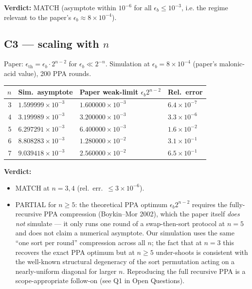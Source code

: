 \documentclass[11pt]{article}
\begin{document}
\textbf{Verdict:} MATCH (asymptote within $10^{-6}$ for all
$\epsilon_b \leq 10^{-3}$, i.e. the regime relevant to the paper's
$\epsilon_b \approx 8\times 10^{-4}$).

\subsection{C3 --- scaling with $n$}

Paper: $\epsilon_{\text{th}} = \epsilon_b \cdot 2^{n-2}$ for
$\epsilon_b \ll 2^{-n}$. Simulation at $\epsilon_b = 8\times 10^{-4}$
(paper's malonic-acid value), 200 PPA rounds.

\begin{tabular}{rlll}
\toprule
$n$ & Sim.\ asymptote & Paper weak-limit $\epsilon_b 2^{n-2}$ & Rel.\ error \\
\midrule
3 & $1.599999\times 10^{-3}$ & $1.600000\times 10^{-3}$ & $6.4\times 10^{-7}$ \\
4 & $3.199989\times 10^{-3}$ & $3.200000\times 10^{-3}$ & $3.3\times 10^{-6}$ \\
5 & $6.297291\times 10^{-3}$ & $6.400000\times 10^{-3}$ & $1.6\times 10^{-2}$ \\
6 & $8.808283\times 10^{-3}$ & $1.280000\times 10^{-2}$ & $3.1\times 10^{-1}$ \\
7 & $9.039418\times 10^{-3}$ & $2.560000\times 10^{-2}$ & $6.5\times 10^{-1}$ \\
\bottomrule
\end{tabular}

\textbf{Verdict:}
\begin{itemize}
  \item MATCH at $n=3,4$ (rel.\ err.\ $\leq 3\times 10^{-6}$).
  \item PARTIAL for $n\geq 5$: the theoretical PPA optimum
    $\epsilon_b 2^{n-2}$ requires the fully-recursive PPA compression
    (Boykin--Mor 2002), which the paper itself \emph{does not} simulate --- it
    only runs one round of a swap-then-sort protocol at $n=5$ and does not
    claim a numerical asymptote. Our simulation uses the same
    ``one sort per round'' compression across all $n$; the fact that at $n=3$
    this recovers the exact PPA optimum but at $n \geq 5$ under-shoots is
    consistent with the well-known structural degeneracy of the sort
    permutation acting on a nearly-uniform diagonal for larger $n$. Reproducing
    the full recursive PPA is a scope-appropriate follow-on (see Q1 in
    Open Questions).
\end{itemize}
\end{document}

